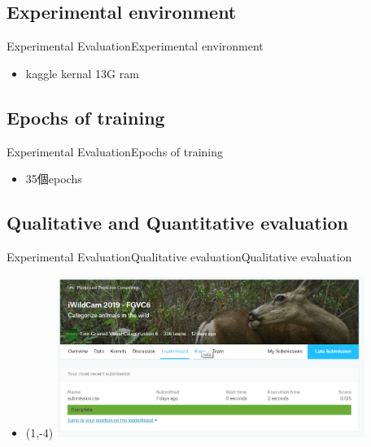 \documentclass{beamer}
\begin{document}
\begin{CJK}{UTF8}{}
\subsection{Experimental environment}

\begin{frame}{Experimental Evaluation}{Experimental environment}
	\begin{itemize}
	\item{
		kaggle kernal
		13G ram
	}
	\end{itemize}
\end{frame}

\subsection{Epochs of training}

\begin{frame}{Experimental Evaluation}{Epochs of training}
	\begin{itemize}
	\item{
		35個epochs
	}
	\end{itemize}
\end{frame}

\subsection{Qualitative and Quantitative evaluation}

\begin{frame}{Experimental Evaluation}{Qualitative evaluationQualitative evaluation}
	\begin{itemize}
	\item{
		\begin{textblock}{3}(1,-4)
		\includegraphics[width=10cm]{sorce.png}
		\end{textblock}
	}
	\end{itemize}
\end{frame}

\end{CJK}
\end{document}
